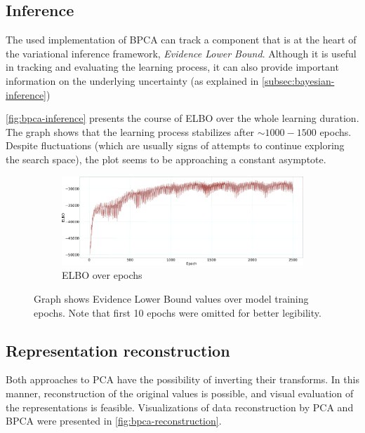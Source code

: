 \subsection{Inference}
The used implementation of BPCA can track a component that is at the heart of the variational inference framework, \textit{Evidence Lower Bound}. Although it is useful in tracking and evaluating the learning process, it can also provide important information on the underlying uncertainty (as explained in \autoref{subsec:bayesian-inference})

\vspace{\baselineskip}
\autoref{fig:bpca-inference} presents the course of ELBO over the whole learning duration. The graph shows that the learning process stabilizes after $\sim1000-1500$ epochs. Despite fluctuations (which are usually signs of attempts to continue exploring the search space), the plot seems to be approaching a constant asymptote. 

\begin{figure}[h]
     \centering
     \begin{subfigure}[b]{0.9\textwidth}
         \centering
         \includegraphics[width=\textwidth]{observational/img/bpca/bpca_elbo.png}
         \caption{ELBO over epochs}
         \label{fig:bpca-inference:loglikelihood}
     \end{subfigure}
     \caption[ELBO course during BPCA inference]{Graph shows Evidence Lower Bound values over model training epochs. Note that first 10 epochs were omitted for better legibility.}
    \label{fig:bpca-inference}
\end{figure}




\subsection{Representation reconstruction}
Both approaches to PCA have the possibility of inverting their transforms. In this manner, reconstruction of the original values is possible, and visual evaluation of the representations is feasible. Visualizations of data reconstruction by PCA and BPCA were presented in \autoref{fig:bpca-reconstruction}.

